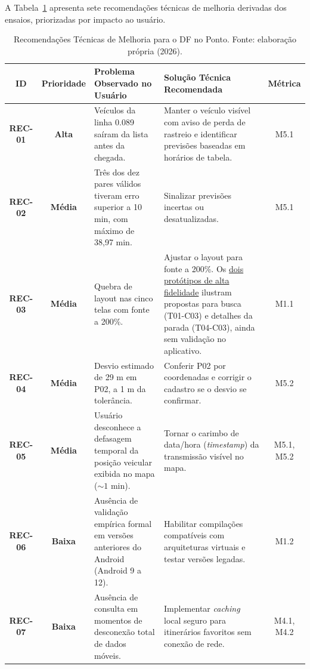 \documentclass[11pt,a4paper]{article}
\begin{document}
A Tabela~\ref{tab:recomendacoes} apresenta sete recomendações técnicas de melhoria derivadas dos ensaios, priorizadas por impacto ao usuário.

\begin{table}[!htbp]
\centering
\caption{Recomendações Técnicas de Melhoria para o DF no Ponto. Fonte: elaboração própria (2026).}
\label{tab:recomendacoes}
\scriptsize
\renewcommand{\arraystretch}{0.84}
\setlength{\tabcolsep}{3.5pt}
\begin{tabularx}{\textwidth}{c c X X c}
\toprule
\textbf{ID} & \textbf{Prioridade} & \textbf{Problema Observado no Usuário} & \textbf{Solução Técnica Recomendada} & \textbf{Métrica} \\
\midrule
\textbf{REC-01} & \textbf{Alta} & Veículos da linha 0.089 saíram da lista antes da chegada. & Manter o veículo visível com aviso de perda de rastreio e identificar previsões baseadas em horários de tabela. & M5.1 \\
\textbf{REC-02} & \textbf{Média} & Três dos dez pares válidos tiveram erro superior a 10 min, com máximo de 38,97 min. & Sinalizar previsões incertas ou desatualizadas. & M5.1 \\
\textbf{REC-03} & \textbf{Média} & Quebra de layout nas cinco telas com fonte a 200\%. & Ajustar o layout para fonte a 200\%. Os \href{https://fcte-qualidade-de-software-1.github.io/2026-2_T02_CAROL_SHAW/fase4/3-resultados/\#7-acao-de-melhoria}{dois protótipos de alta fidelidade} ilustram propostas para busca (T01-C03) e detalhes da parada (T04-C03), ainda sem validação no aplicativo. & M1.1 \\
\textbf{REC-04} & \textbf{Média} & Desvio estimado de 29 m em P02, a 1 m da tolerância. & Conferir P02 por coordenadas e corrigir o cadastro se o desvio se confirmar. & M5.2 \\
\textbf{REC-05} & \textbf{Média} & Usuário desconhece a defasagem temporal da posição veicular exibida no mapa ($\sim 1$ min). & Tornar o carimbo de data/hora (\textit{timestamp}) da transmissão visível no mapa. & M5.1, M5.2 \\
\textbf{REC-06} & \textbf{Baixa} & Ausência de validação empírica formal em versões anteriores do Android (Android 9 a 12). & Habilitar compilações compatíveis com arquiteturas virtuais e testar versões legadas. & M1.2 \\
\textbf{REC-07} & \textbf{Baixa} & Ausência de consulta em momentos de desconexão total de dados móveis. & Implementar \textit{caching} local seguro para itinerários favoritos sem conexão de rede. & M4.1, M4.2 \\
\bottomrule
\end{tabularx}
\end{table}
\end{document}
